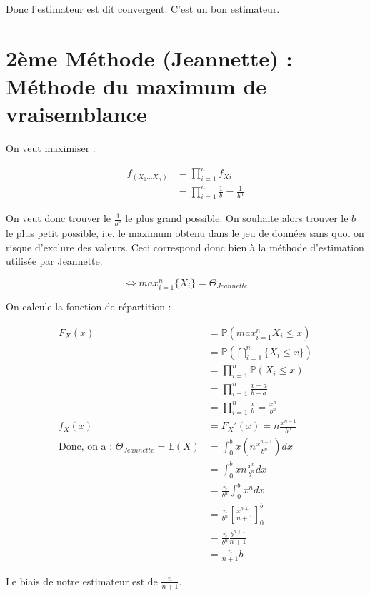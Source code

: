 \documentclass{article}
\begin{document}
Donc l'estimateur est dit convergent. C'est un bon estimateur.

\section{2ème Méthode (Jeannette) : Méthode du maximum de vraisemblance}

On veut maximiser :

\begin{equation}
    \begin{aligned}
        f_{(X_1...X_n)}&=\prod_{i=1}^{n}f_{Xi}\\
        &=\prod_{i=1}^{n}\frac{1}{b}=\frac{1}{b^n}
    \end{aligned}
\end{equation}

On veut donc trouver le $\frac{1}{b^n}$ le plus grand possible. On souhaite alors trouver le $b$ le plus petit possible, i.e. le maximum obtenu dans le jeu de données sans quoi on risque d'exclure des valeurs. Ceci correspond donc bien à la méthode d'estimation utilisée par Jeannette.

$$
\Leftrightarrow max_{i=1}^n \{X_i\} = \Theta_{Jeannette}
$$

On calcule la fonction de répartition :

\begin{equation}
    \begin{aligned}
        F_X(x)&=\mathbb{P}(max_{i=1}^nX_i\leq x)\\
        &=\mathbb{P}(\bigcap_{i=1}^n\{X_i\leq x\})\\
        &=\prod_{i=1}^n\mathbb{P}(X_i\leq x)\\
        &=\prod_{i=1}^n \frac{x-a}{b-a}\\
        &=\prod_{i=1}^n \frac{x}{b}=\frac{x^n}{b^n}\\
        f_X(x)&=F_X'(x)=n\frac{x^{n-1}}{b^n}\\
        \text{Donc, on a : }\Theta_{Jeannette}=\mathbb{E}(X)&=\int_0^b x(n\frac{x^{n-1}}{b^n})dx\\
        &=\int_0^b xn\frac{x^n}{b^n}dx\\
        &=\frac{n}{b^n}\int_0^b x^ndx\\
        &=\frac{n}{b^n}[\frac{x^{n+1}}{n+1}]_0^b\\
        &=\frac{n}{b^n}\frac{b^{n+1}}{n+1}\\
        &=\frac{n}{n+1}b
    \end{aligned}
\end{equation}

Le biais de notre estimateur est de $\frac{n}{n+1}$.
\end{document}
